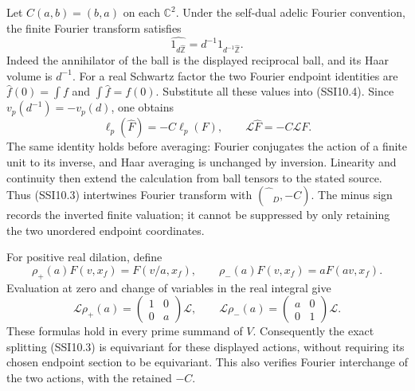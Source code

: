 Let \(C(a,b)=(b,a)\) on each \(\mathbb C^2\). Under the self-dual adelic
Fourier convention, the finite Fourier transform satisfies \[
\widehat{1_{d\widehat{\mathbb Z}}}
=d^{-1}1_{d^{-1}\widehat{\mathbb Z}}.
\tag{SSI10.5}
\] Indeed the annihilator of the ball is the displayed reciprocal ball,
and its Haar volume is \(d^{-1}\). For a real Schwartz factor the two
Fourier endpoint identities are \(\widehat f(0)=\int f\) and
\(\int\widehat f=f(0)\). Substitute all these values into (SSI10.4).
Since \(v_p(d^{-1})=-v_p(d)\), one obtains \[
\ell_p(\widehat F)=-C\ell_p(F),\qquad
\boxed{\mathscr L\widehat F=-C\mathscr LF.}
\tag{SSI10.6}
\] The same identity holds before averaging: Fourier conjugates the
action of a finite unit to its inverse, and Haar averaging is unchanged
by inversion. Linearity and continuity then extend the calculation from
ball tensors to the stated source. Thus (SSI10.3) intertwines Fourier
transform with \((\widehat{\phantom F}_D,-C)\). The minus sign records
the inverted finite valuation; it cannot be suppressed by only retaining
the two unordered endpoint coordinates.

For positive real dilation, define \[
\rho_+(a)F(v,x_f)=F(v/a,x_f),\qquad
\rho_-(a)F(v,x_f)=aF(av,x_f).
\tag{SSI10.7}
\] Evaluation at zero and change of variables in the real integral give
\[
\mathscr L\rho_+(a)=
\begin{pmatrix}1&0\\0&a\end{pmatrix}\mathscr L,
\qquad
\mathscr L\rho_-(a)=
\begin{pmatrix}a&0\\0&1\end{pmatrix}\mathscr L.
\tag{SSI10.8}
\] These formulas hold in every prime summand of \(V\). Consequently the
exact splitting (SSI10.3) is equivariant for these displayed actions,
without requiring its chosen endpoint section to be equivariant. This
also verifies Fourier interchange of the two actions, with the retained
\(-C\).

